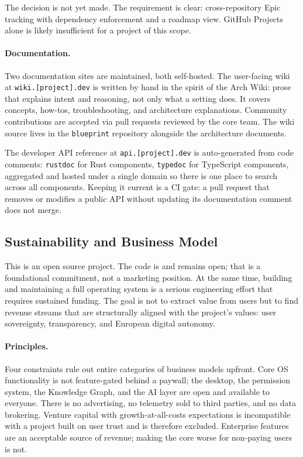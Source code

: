 The decision is not yet made. The requirement is clear: cross-repository Epic
tracking with dependency enforcement and a roadmap view. GitHub Projects alone
is likely insufficient for a project of this scope.

\paragraph{Documentation.}
Two documentation sites are maintained, both self-hosted. The user-facing wiki
at \texttt{wiki.[project].dev} is written by hand in the spirit of the Arch
Wiki: prose that explains intent and reasoning, not only what a setting does.
It covers concepts, how-tos, troubleshooting, and architecture explanations.
Community contributions are accepted via pull requests reviewed by the core
team. The wiki source lives in the \texttt{blueprint} repository alongside the
architecture documents.

The developer API reference at \texttt{api.[project].dev} is auto-generated
from code comments: \texttt{rustdoc} for Rust components,
\texttt{typedoc} for TypeScript components, aggregated and hosted under a single
domain so there is one place to search across all components. Keeping it
current is a CI gate: a pull request that removes or modifies a public API
without updating its documentation comment does not merge.

\subsection{Sustainability and Business Model}
\label{sec:business}

This is an open source project. The code is and remains open; that is a
foundational commitment, not a marketing position. At the same time, building
and maintaining a full operating system is a serious engineering effort that
requires sustained funding. The goal is not to extract value from users but to
find revenue streams that are structurally aligned with the project's values:
user sovereignty, transparency, and European digital autonomy.

\paragraph{Principles.}
Four constraints rule out entire categories of business models upfront. Core
OS functionality is not feature-gated behind a paywall; the desktop, the
permission system, the Knowledge Graph, and the AI layer are open and available
to everyone. There is no advertising, no telemetry sold to third parties, and
no data brokering. Venture capital with growth-at-all-costs expectations is
incompatible with a project built on user trust and is therefore excluded.
Enterprise features are an acceptable source of revenue; making the core worse
for non-paying users is not.

